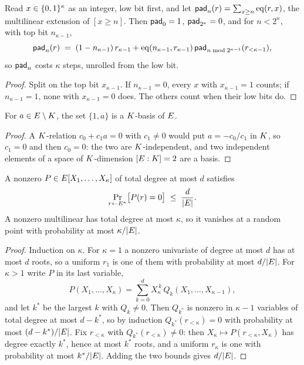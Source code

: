 \begin{lemma}\label{lem:suffix}
Read $x\in\{0,1\}^{\kappa}$ as an integer, low bit first, and let $\mathsf{pad}_{n}(r)=\sum_{x\ge n}\operatorname{eq}(r,x)$, the multilinear extension of $[x\ge n]$. Then $\mathsf{pad}_{0}=1$, $\mathsf{pad}_{2^{\kappa}}=0$, and for $n<2^{\kappa}$, with top bit $n_{\kappa-1}$,
\[
  \mathsf{pad}_{n}(r)\;=\;(1-n_{\kappa-1})\,r_{\kappa-1}+\operatorname{eq}(n_{\kappa-1},r_{\kappa-1})\,\mathsf{pad}_{n\bmod2^{\kappa-1}}(r_{<\kappa-1}),
\]
so $\mathsf{pad}_{n}$ costs $\kappa$ steps, unrolled from the low bit.
\end{lemma}

\begin{proof}
Split on the top bit $x_{\kappa-1}$. If $n_{\kappa-1}=0$, every $x$ with $x_{\kappa-1}=1$ counts; if $n_{\kappa-1}=1$, none with $x_{\kappa-1}=0$ does. The others count when their low bits do.
\end{proof}


\begin{lemma}\label{lem:kbasis}
For $a\in E\setminus K$, the set $\{1,a\}$ is a $K$-basis of $E$.
\end{lemma}

\begin{proof}
A $K$-relation $c_0+c_1a=0$ with $c_1\neq0$ would put $a=-c_0/c_1$ in $K$, so $c_1=0$ and then $c_0=0$: the two are $K$-independent, and two independent elements of a space of $K$-dimension $[E:K]=2$ are a basis.
\end{proof}

\begin{lemma}\label{lem:sz}
A nonzero $P\in E[X_1,\dots,X_{\kappa}]$ of total degree at most $d$ satisfies
\[
  \Pr_{r\leftarrow E^{\kappa}}\bigl[P(r)=0\bigr]\;\le\;\frac{d}{|E|}.
\]
A nonzero multilinear has total degree at most $\kappa$, so it vanishes at a random point with probability at most $\kappa/|E|$.
\end{lemma}

\begin{proof}
Induction on $\kappa$. For $\kappa=1$ a nonzero univariate of degree at most $d$ has at most $d$ roots, so a uniform $r_1$ is one of them with probability at most $d/|E|$. For $\kappa>1$ write $P$ in its last variable,
\[
  P(X_1,\dots,X_{\kappa})=\sum_{k=0}^{d}X_{\kappa}^{\,k}\,Q_k(X_1,\dots,X_{\kappa-1}),
\]
and let $k^{\ast}$ be the largest $k$ with $Q_k\neq0$. Then $Q_{k^{\ast}}$ is nonzero in $\kappa-1$ variables of total degree at most $d-k^{\ast}$, so by induction $Q_{k^{\ast}}(r_{<\kappa})=0$ with probability at most $(d-k^{\ast})/|E|$. Fix $r_{<\kappa}$ with $Q_{k^{\ast}}(r_{<\kappa})\neq0$: then $X_{\kappa}\mapsto P(r_{<\kappa},X_{\kappa})$ has degree exactly $k^{\ast}$, hence at most $k^{\ast}$ roots, and a uniform $r_{\kappa}$ is one with probability at most $k^{\ast}/|E|$. Adding the two bounds gives $d/|E|$.
\end{proof}

